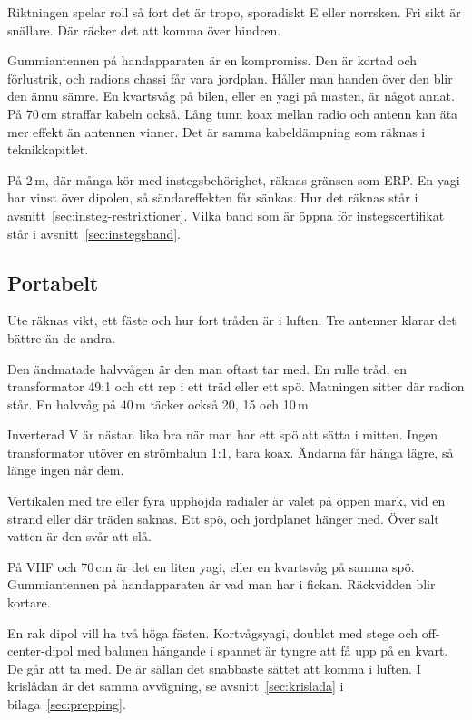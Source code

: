 Riktningen spelar roll så fort det är tropo, sporadiskt E eller
norrsken. Fri sikt är snällare. Där räcker det att komma över hindren.

Gummiantennen på handapparaten är en kompromiss. Den är kortad och
förlustrik, och radions chassi får vara jordplan. Håller man handen
över den blir den ännu sämre. En kvartsvåg på bilen, eller en yagi på
masten, är något annat. På 70\,cm straffar kabeln också. Lång tunn
koax mellan radio och antenn kan äta mer effekt än antennen
vinner. Det är samma kabeldämpning som räknas i teknikkapitlet.

På 2\,m, där många kör med instegsbehörighet, räknas gränsen som
ERP. En yagi har vinst över dipolen, så sändareffekten får sänkas.
Hur det räknas står i avsnitt~\ref{sec:insteg-restriktioner}. Vilka
band som är öppna för instegscertifikat står i
avsnitt~\ref{sec:instegsband}.

\subsection{Portabelt}
\label{sec:portabelt}

Ute räknas vikt, ett fäste och hur fort tråden är i luften. Tre
antenner klarar det bättre än de andra.

Den ändmatade halvvågen är den man oftast tar med. En rulle tråd, en
transformator 49:1 och ett rep i ett träd eller ett spö. Matningen
sitter där radion står. En halvvåg på 40\,m täcker också 20, 15 och
10\,m.

Inverterad V är nästan lika bra när man har ett spö att sätta i mitten.
Ingen transformator utöver en strömbalun 1:1, bara koax. Ändarna får
hänga lägre, så länge ingen når dem.

Vertikalen med tre eller fyra upphöjda radialer är valet på öppen
mark, vid en strand eller där träden saknas. Ett spö, och jordplanet
hänger med. Över salt vatten är den svår att slå.

På VHF och 70\,cm är det en liten yagi, eller en kvartsvåg på samma
spö. Gummiantennen på handapparaten är vad man har i fickan.
Räckvidden blir kortare.

En rak dipol vill ha två höga fästen. Kortvågsyagi, doublet med stege
och off-center-dipol med balunen hängande i spannet är tyngre att få
upp på en kvart. De går att ta med. De är sällan det snabbaste sättet
att komma i luften. I krislådan är det samma avvägning, se
avsnitt~\ref{sec:krislada} i bilaga~\ref{sec:prepping}.

